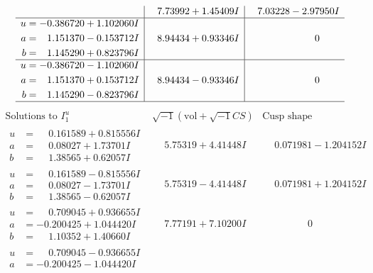 \documentclass[1p]{elsarticle_modified}
\theoremstyle{definition}
\newcommand{\I}{\sqrt{-1}}
\begin{document}
$$\begin{array}{c|c|c}
 & \phantom{-}7.73992 + 1.45409 I & \phantom{-}7.03228 - 2.97950 I \\ \hline\begin{aligned}
u &= -0.386720 + 1.102060 I \\
a &= \phantom{-}1.151370 - 0.153712 I \\
b &= \phantom{-}1.145290 + 0.823796 I\end{aligned}
 & \phantom{-}8.94434 + 0.93346 I & \phantom{-0.000000 } 0 \\ \hline\begin{aligned}
u &= -0.386720 - 1.102060 I \\
a &= \phantom{-}1.151370 + 0.153712 I \\
b &= \phantom{-}1.145290 - 0.823796 I\end{aligned}
 & \phantom{-}8.94434 - 0.93346 I & \phantom{-0.000000 } 0\\
 \hline 
 \end{array}$$\newpage$$\begin{array}{c|c|c}  
\text{Solutions to }I^u_{1}& \I (\text{vol} + \sqrt{-1}CS) & \text{Cusp shape}\\
 \hline 
\begin{aligned}
u &= \phantom{-}0.161589 + 0.815556 I \\
a &= \phantom{-}0.08027 + 1.73701 I \\
b &= \phantom{-}1.38565 + 0.62057 I\end{aligned}
 & \phantom{-}5.75319 + 4.41448 I & \phantom{-}0.071981 - 1.204152 I \\ \hline\begin{aligned}
u &= \phantom{-}0.161589 - 0.815556 I \\
a &= \phantom{-}0.08027 - 1.73701 I \\
b &= \phantom{-}1.38565 - 0.62057 I\end{aligned}
 & \phantom{-}5.75319 - 4.41448 I & \phantom{-}0.071981 + 1.204152 I \\ \hline\begin{aligned}
u &= \phantom{-}0.709045 + 0.936655 I \\
a &= -0.200425 + 1.044420 I \\
b &= \phantom{-}1.10352 + 1.40660 I\end{aligned}
 & \phantom{-}7.77191 + 7.10200 I & \phantom{-0.000000 } 0 \\ \hline\begin{aligned}
u &= \phantom{-}0.709045 - 0.936655 I \\
a &= -0.200425 - 1.044420 I \\

\end{aligned}
\end{array}$$
\end{document}
